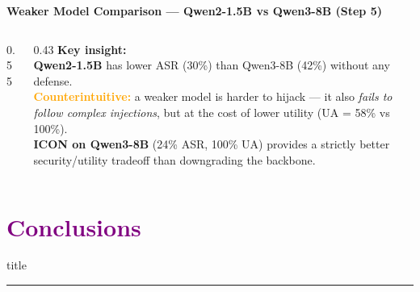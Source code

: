 \documentclass[aspectratio=169]{beamer}
\begin{document}
\begin{frame}{\textcolor{cmindsblue}{\textbf{Weaker Model Comparison — Qwen2-1.5B vs Qwen3-8B (Step 5)}}}
  \vspace{-0.3cm}
  \begin{columns}[T]
    \begin{column}{0.55\textwidth}
      
    \end{column}

    \begin{column}{0.43\textwidth}
      \textcolor{cmindsblue}{\textbf{Key insight:}}\\[4pt]
      {\small
      \textbf{Qwen2-1.5B} has lower ASR (30\%) than Qwen3-8B (42\%) without any defense.\\[4pt]
      \textcolor{orange}{\textbf{Counterintuitive:}} a weaker model is harder to hijack — it
      also \textit{fails to follow complex injections}, but at the cost of
      lower utility (UA = 58\% vs 100\%).\\[4pt]
      \textbf{ICON on Qwen3-8B} (24\% ASR, 100\% UA) provides a strictly better
      security/utility tradeoff than downgrading the backbone.
      }

      \vspace{3mm}
      \begin{center}
      \end{center}
    \end{column}
  \end{columns}
\end{frame}


\section{\textbf{\textcolor{purple}{Conclusions}}}
\begin{frame}[plain]\vfill\centering
  \begin{beamercolorbox}[sep=8pt,center,shadow=true,rounded=true]{title}
    \insertsectionhead\par
    \color{oxfordblue}\noindent\rule{10cm}{1pt}
  \end{beamercolorbox}\vfill
\end{frame}
\end{document}

